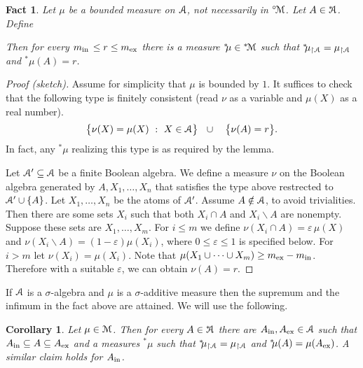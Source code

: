 \documentclass[12pt,letterpaper,oneside,reqno]{amsart}
\theoremstyle{plain}
\newtheorem{fact}[theorem]{Fact}
\newtheorem{corollary}[theorem]{Corollary}
\theoremstyle{remark}
\begin{document}
\begin{fact}
  Let $\mu$ be a bounded measure on ${\EuScript A}$, not necessarily in ${}^{\circ\!}{\EuScript M}$.
  Let $A\in{}^{*\!\!\!}{\EuScript A}$.
  Define 
  


  Then for every $m_{\rm in\,}\le r\le m_{\rm ex}$ there is a measure ${}^{*\!\!}\mu\in{}^{*\!}{\EuScript M}$ such that ${}^{*\!\!}\mu_{\restriction{\EuScript A}}=\mu_{\restriction{\EuScript A}}$ and  ${}^{*\!\!}\mu(A)=r$.
\end{fact}

\begin{proof}[Proof (sketch)]
Assume for simplicity that $\mu$ is bounded by $1$.
It suffices to check that the following type is finitely consistent (read $\nu$ as a variable and $\mu(X)$ as a real number).
$$
\big\{\nu(X)=\mu(X) \ :\ X\in{\EuScript A}\big\}
\ \ \cup\ \ \
\big\{\nu(A)=r\big\}.
$$
In fact, any ${}^{*\!\!}\mu$ realizing this type is as required by the lemma.

Let ${\EuScript A}'\subseteq{\EuScript A}$ be a finite Boolean algebra.
We define a measure $\nu$ on the Boolean algebra generated by $A,X_1,\dots,X_n$ that satisfies the type above restrected to ${\EuScript A}'\cup\{A\}$.
Let $X_1,\dots,X_n$ be the atoms of ${\EuScript A}'$.
Assume $A\notin{\EuScript A}$, to avoid trivialities.
Then there are some sets $X_i$ such that both $X_i\cap A$ and $X_i\smallsetminus A$ are nonempty.
Suppose these sets are $X_1,\dots,X_m$.
For $i\le m$ we define $\nu(X_i\cap A)=\varepsilon\,\mu(X)$ and $\nu(X_i\smallsetminus A)=(1-\varepsilon)\mu(X_i)$, where $0\le\varepsilon\le1$ is specified below.
For $i>m$ let $\nu(X_i)=\mu(X_i)$.
Note that $\mu(X_1\cup\dots\cup X_m)\ge m_{\rm ex}-m_{\rm in}$.
Therefore with a suitable $\varepsilon$, we can obtain $\nu(A)=r$.
\end{proof}

If ${\EuScript A}$ is a $\sigma$-algebra and $\mu$ is a $\sigma$-additive measure then the supremum and the infimum in the fact above are attained.
We will use the following.

\begin{corollary}
  Let $\mu\in{\EuScript M}$.
  Then for every $A\in{}^{*\!\!\!}{\EuScript A}$ there are $A_{\rm in},A_{\rm ex}\in{\EuScript A}$ such that $A_{\rm in}\subseteq A\subseteq A_{\rm ex}$ and a measures ${}^{*\!\!}\mu$ such that 
  ${}^{*\!\!}\mu_{\restriction{\EuScript A}}=\mu_{\restriction{\EuScript A}}$ and ${}^{*\!\!}\mu(A)=\mu(A_{\rm ex})$.  
  A similar claim holds for $A_{\rm in}$.
\end{corollary}
\end{document}
